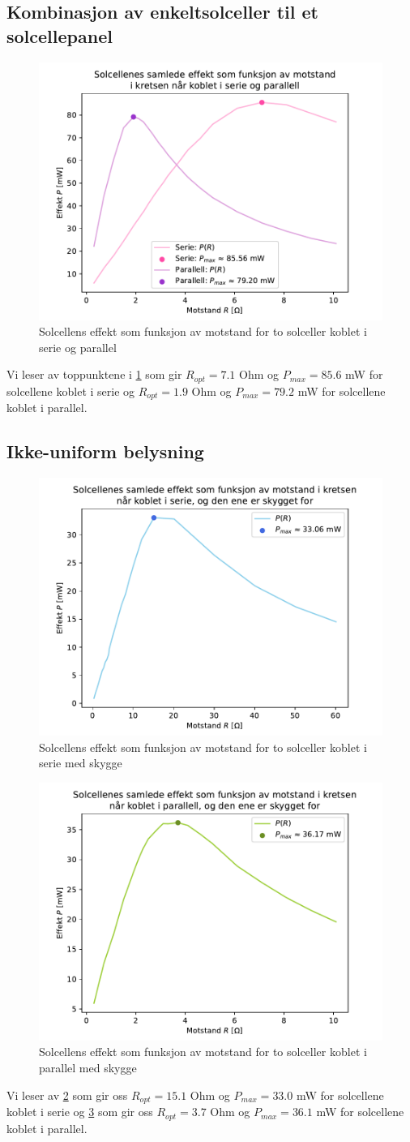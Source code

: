 \documentclass[reprint,norsk,notitlepage]{revtex4-2}
\begin{document}
\subsection{Kombinasjon av enkeltsolceller til et solcellepanel}
\begin{figure}[h!]
  \centering
  \includegraphics[width = .4\textwidth]{solcellen-oppg-3.pdf}
  \caption{Solcellens effekt som funksjon av motstand for to solceller koblet i serie og parallel}
  \label{fig: effekt-motstand-serie-parallel}
\end{figure}
Vi leser av toppunktene i \cref{fig: effekt-motstand-serie-parallel} som gir $R_{opt} = 7.1$ Ohm og $P_{max} = 85.6$ mW for solcellene koblet i serie og $R_{opt} = 1.9$ Ohm og $P_{max} = 79.2$ mW for solcellene koblet i parallel.
\subsection{Ikke-uniform belysning}
\begin{figure}[h!]
  \centering
  \includegraphics[width = .4\textwidth]{solcellen-oppg-4-serie.pdf}
  \caption{Solcellens effekt som funksjon av motstand for to solceller koblet i serie med skygge}
  \label{fig: effekt-motstand-serie-skygge}
\end{figure}

\begin{figure}[h!]
  \centering
  \includegraphics[width = .4\textwidth]{solcellen-oppg-4-parallell.pdf}
  \caption{Solcellens effekt som funksjon av motstand for to solceller koblet i parallel med skygge}
  \label{fig: effekt-motstand-parallell-skygge}
\end{figure}
Vi leser av \cref{fig: effekt-motstand-serie-skygge} som gir oss $R_{opt} = 15.1$ Ohm og $P_{max} = 33.0$ mW for solcellene koblet i serie og \cref{fig: effekt-motstand-parallell-skygge} som gir oss $R_{opt} = 3.7$ Ohm og $P_{max} = 36.1$ mW for solcellene koblet i parallel.
\end{document}
